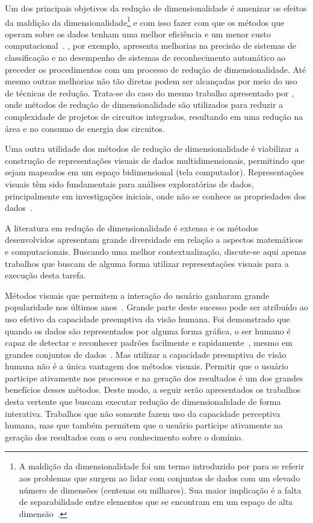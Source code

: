 Um dos principais objetivos da redução de dimensionalidade é
amenizar os efeitos da maldição da
dimensionalidade\footnote{A maldição da dimensionalidade foi
    um termo introduzido por \citet{Bellman1961} para se
    referir aos problemas que surgem ao lidar com conjuntos
    de dados com um elevado número de dimensões (centenas ou
    milhares). Sua maior implicação é a falta de
separabilidade entre elementos que se encontram em um espaço
de alta dimensão~\cite{Kouiroukidis2011}.} e com isso fazer
com que os métodos que operam sobre os dados tenham uma
melhor eficiência e um menor custo
computacional~\cite{Maaten2009}.  \citet{Konig2000}, por
exemplo, apresenta melhorias na precisão de sistemas de
classificação e no desempenho de sistemas de reconhecimento
automático ao preceder os procedimentos com um processo de
redução de dimensionalidade. Até mesmo outras melhorias não
tão diretas podem ser alcançadas por meio do uso de técnicas
de redução.  Trata-se do caso do mesmo trabalho apresentado
por \citeauthor{Konig2000}, onde métodos de redução de
dimensionalidade são utilizados para reduzir a complexidade
de projetos de circuitos integrados, resultando em uma
redução na área e no consumo de energia dos circuitos. 

Uma outra utilidade dos métodos de redução de
dimensionalidade é viabilizar a construção de representações
visuais de dados multidimensionais, permitindo que sejam
mapeados em um espaço bidimensional (tela computador).
Representações visuais têm sido fundamentais para análises
exploratórias de dados, principalmente em investigações
iniciais, onde não
se conhece as propriedades dos dados~\cite{Kaski2011}. 

A literatura em redução de dimensionalidade é extensa e os
métodos desenvolvidos apresentam grande diversidade em
relação a aspectos matemáticos e computacionais. Buscando
uma melhor contextualização, discute-se aqui apenas
trabalhos que buscam de alguma forma utilizar representações
visuais para a execução desta tarefa.

Métodos visuais que permitem a interação do usuário ganharam
grande popularidade nos últimos anos~\cite{State2012}.
Grande parte deste sucesso pode ser atribuído ao uso efetivo
da capacidade preemptiva da visão humana. Foi demonstrado
que quando os dados são representados por alguma forma
gráfica, o ser humano é capaz de detectar e reconhecer
padrões facilmente e rapidamente~\cite{Healey1995}, mesmo em
grandes conjuntos de dados~\cite{Fodor2002}. Mas utilizar a
capacidade preemptiva de visão humana não é a única vantagem
dos métodos visuais. Permitir que o usuário participe
ativamente nos processos e na geração dos resultados é um
dos grandes benefícios desses métodos. Deste
modo, a seguir serão apresentados os trabalhos desta 
vertente que buscam executar redução de dimensionalidade de
forma interativa. Trabalhos que não somente fazem uso da
capacidade perceptiva humana, mas que também permitem
que o usuário participe ativamente na geração dos resultados
com o seu conhecimento sobre o domínio.

